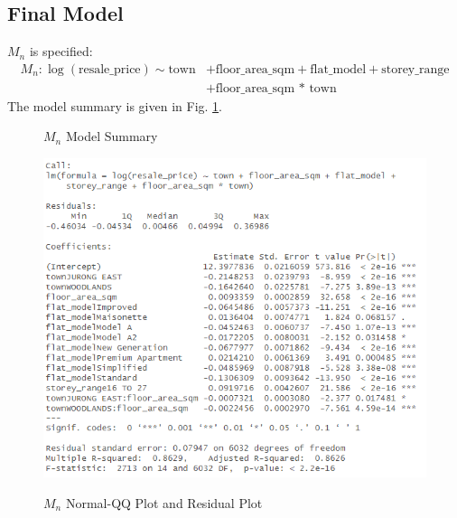 \subsection{Final Model}
$M_n$ is specified:
\begin{align*}
    M_n : \log(\text{resale\_price}) \sim \text{town} &+ \text{floor\_area\_sqm} + \text{flat\_model} + \text{storey\_range} \\ &+ \text{floor\_area\_sqm * town} 
\end{align*}
The model summary is given in Fig. \ref{fig: mn model summary}.
\begin{figure}[!htp]
\centering
\begin{minipage}[t]{0.6\textwidth}
  \centering
    \caption{$M_n$ Model Summary}
    \includegraphics[width=\textwidth]{images2/Screenshot 2023-04-13 014027.png}
    \label{fig: mn model summary}
\end{minipage}\hfill
\begin{minipage}[t]{0.35\textwidth}
  \centering
  \caption{$M_n$ Normal-QQ Plot and Residual Plot}

\end{minipage}
\end{figure}
